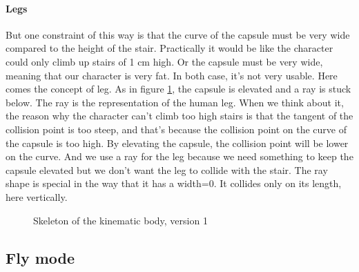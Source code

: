 \documentclass[10pt,a4paper]{article}
\begin{document}
\paragraph{Legs} But one constraint of this way is that the curve of the capsule must be very wide compared to the height of the stair. Practically it would be like the character could only climb up stairs of 1 cm high. Or the capsule must be very wide, meaning that our character is very fat. In both case, it's not very usable. Here comes the concept of leg. As in figure \ref{fig:kinematic_skeleton_1}, the capsule is elevated and a ray is stuck below. The ray is the representation of the human leg. When we think about it, the reason why the character can't climb too high stairs is that the tangent of the collision point is too steep, and that's because the collision point on the curve of the capsule is too high. By elevating the capsule, the collision point will be lower on the curve. And we use a ray for the leg because we need something to keep the capsule elevated but we don't want the leg to collide with the stair. The ray shape is special in the way that it has a width=0. It collides only on its length, here vertically.

\begin{figure}[h]
\centering
{}
\caption{Skeleton of the kinematic body, version 1}
\label{fig:kinematic_skeleton_1}
\end{figure}

\subsection{Fly mode}
\label{subsec:fly_mode}
\end{document}
